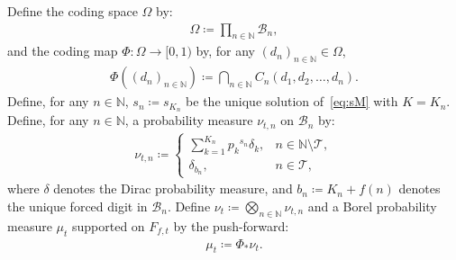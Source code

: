 \documentclass[12pt,reqno]{amsart}
\theoremstyle{definition}
\theoremstyle{plain}
\begin{document}
Define the coding space $\Omega$ by:
\begin{align*}
    \Omega\coloneqq\prod_{n\in\mathbb{N}}\mathcal{B}_n,
\end{align*}
and the coding map $\Phi:\Omega\to[0,1)$ by, for any $(d_n)_{n\in\mathbb{N}}\in\Omega$,
\begin{align*}
    \Phi\left((d_n)_{n\in\mathbb{N}}\right)\coloneqq\bigcap_{n\in\mathbb{N}}C_n(d_1,d_2,\ldots,d_n).
\end{align*}
Define, for any $n\in\mathbb{N}$, $s_n\coloneqq s_{K_n}$ be the unique solution of~\eqref{eq:sM} with $K=K_n$. Define, for any $n\in\mathbb{N}$, a probability measure $\nu_{t,n}$ on $\mathcal{B}_n$ by:
\begin{align*}
    \nu_{t,n}\coloneqq
    \begin{cases}
    \displaystyle \sum_{k=1}^{K_n}{p_k}^{s_n}\delta_k, & n\in\mathbb{N}\setminus{\mathcal{T} },\\
    \delta_{b_n}, & n\in \mathcal{T} ,
    \end{cases}
\end{align*}
where $\delta$ denotes the Dirac probability measure, and $b_n\coloneqq K_n+f(n)$ denotes the unique forced digit in $\mathcal B_n$. %
Define $\nu_t\coloneqq\bigotimes_{n\in\mathbb{N}}\nu_{t,n}$ and a Borel probability measure $\mu_t$ supported on $F_{f,t}$ by the push-forward:
\begin{align*}
    \mu_t\coloneqq\Phi_*\nu_t.
\end{align*}
\end{document}
